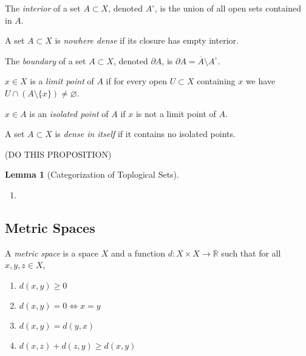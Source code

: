 \documentclass{article}
\newcommand{\R}{\mathbb{R}}
\newenvironment{definition}[1][Definition:]{\begin{trivlist}
\item[\hskip \labelsep {\bfseries #1}]}{\end{trivlist}}
\theoremstyle{theorem}
\newtheorem{lemma}[theorem]{Lemma}
\theoremstyle{definition}
\theoremstyle{definition}
\theoremstyle{remark}
\theoremstyle{definition}
\theoremstyle{remark}
\begin{document}
\begin{definition}
The \textit{interior} of a set $A \subset X$, denoted $A^\circ$, is the union of all open sets contained in $A$. 
\end{definition}

\begin{definition}
A set $A \subset X$ is \textit{nowhere dense} if its closure has empty interior.    
\end{definition}


\begin{definition}
The \textit{boundary} of a set $A \subset X$, denoted $\partial A$, is $\partial A = \overline{A} \setminus A^{\circ}$. 
\end{definition}

\begin{definition}
$x \in X$ is a \textit{limit point} of $A$ if for every open $U \subset X$ containing $x$ we have $U \cap (A \setminus \{x\}) \neq \varnothing$. 
\end{definition}

\begin{definition}
$x \in A$ is an \textit{isolated point} of $A$ if $x$ is not a limit point of $A$.
\end{definition}

\begin{definition}
A set $A \subset X$ is \textit{dense in itself} if it contains no isolated points.    
\end{definition}

(DO THIS PROPOSITION)

\begin{lemma}[Categorization of Toplogical Sets]
\leavevmode
\begin{enumerate}
\item 
\end{enumerate}
\end{lemma}

\subsection{Metric Spaces}

\begin{definition}
A \textit{metric space} is a space $X$ and a function $d : X \times X \to \R$ such that for all $x,y,z \in X$,
\begin{enumerate}
\item $d(x,y) \ge 0$
\item $d(x,y) = 0 \iff x = y$
\item $d(x,y) = d(y,x)$
\item $d(x,z) + d(z,y) \ge d(x,y)$
\end{enumerate} 
\end{definition}
\end{document}
